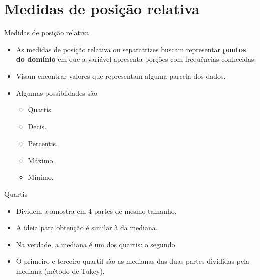 \documentclass[
  ignorenonframetext,
  serif,
  professionalfont,
  usenames,
  dvipsnames,
  aspectratio = 169]{beamer}
\providecommand{\tightlist}{%
  \setlength{\itemsep}{0pt}\setlength{\parskip}{0pt}}
\renewcommand{\tightlist}{%
  \setlength{\itemsep}{0\baselineskip}
  \setlength{\parskip}{0.25\baselineskip}
}
\def\beginAHalfColumn{\begin{minipage}{0.49\textwidth}}%
\def\endColumns{\end{minipage}}%
\begin{document}
\hypertarget{medidas-de-posiuxe7uxe3o-relativa}{%
\section{Medidas de posição
relativa}\label{medidas-de-posiuxe7uxe3o-relativa}}

\begin{frame}{Medidas de posição relativa}
\protect\hypertarget{medidas-de-posiuxe7uxe3o-relativa-1}{}
\beginAHalfColumn

\begin{itemize}
\item
  As medidas de posição relativa ou separatrizes buscam representar
  \textbf{pontos do domínio} em que a variável apresenta porções com
  frequências conhecidas.
\item
  Visam encontrar valores que representam alguma parcela dos dados.
\end{itemize}

\endColumns
\beginAHalfColumn

\begin{itemize}
\tightlist
\item
  Algumas possiblidades são

  \begin{itemize}
  \tightlist
  \item
    Quartis.
  \item
    Decis.
  \item
    Percentis.
  \item
    Máximo.
  \item
    Mínimo.
  \end{itemize}
\end{itemize}

\endColumns
\end{frame}

\begin{frame}{Quartis}
\protect\hypertarget{quartis}{}
\begin{itemize}
\tightlist
\item
  Dividem a amostra em \(4\) partes de mesmo tamanho.
\item
  A ideia para obtenção é similar à da mediana.
\item
  Na verdade, a mediana é um dos quartis: o segundo.
\item
  O primeiro e terceiro quartil são as medianas das duas partes
  divididas pela mediana (método de Tukey).
\end{itemize}
\end{frame}
\end{document}
